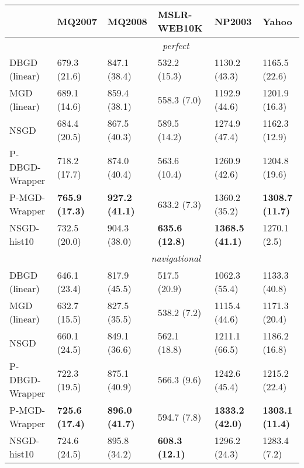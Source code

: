 \begin{tabular*}{\textwidth}{@{\extracolsep{\fill} } l  l l l l l  }
\toprule
 & { \small \textbf{MQ2007}}  & { \small \textbf{MQ2008}}  & { \small \textbf{MSLR-WEB10K}}  & { \small \textbf{NP2003}}  & { \small \textbf{Yahoo}} \\
\midrule
& \multicolumn{5}{|c|}{\textit{perfect}} \\
\midrule
DBGD (linear) & 679.3 {\tiny (21.6)} & 847.1 {\tiny (38.4)} & 532.2 {\tiny (15.3)} & 1130.2 {\tiny (43.3)} & 1165.5 {\tiny (22.6)} \\
MGD (linear) & 689.1 {\tiny (14.6)} & 859.4 {\tiny (38.1)} & 558.3 {\tiny (7.0)} & 1192.9 {\tiny (44.6)} & 1201.9 {\tiny (16.3)} \\
NSGD & 684.4 {\tiny (20.5)} & 867.5 {\tiny (40.3)} & 589.5 {\tiny (14.2)} & 1274.9 {\tiny (47.4)} & 1162.3 {\tiny (12.9)} \\
P-DBGD-Wrapper & 718.2 {\tiny (17.7)} & 874.0 {\tiny (40.4)} & 563.6 {\tiny (10.4)} & 1260.9 {\tiny (42.6)} & 1204.8 {\tiny (19.6)} \\
P-MGD-Wrapper & \bf 765.9 {\tiny (17.3)} & \bf 927.2 {\tiny (41.1)} & 633.2 {\tiny (7.3)} & 1360.2 {\tiny (35.2)} & \bf 1308.7 {\tiny (11.7)} \\
NSGD-hist10 & 732.5 {\tiny (20.0)} & 904.3 {\tiny (38.0)} & \bf 635.6 {\tiny (12.8)} & \bf 1368.5 {\tiny (41.1)} & 1270.1 {\tiny (2.5)} \\
\midrule
& \multicolumn{5}{|c|}{\textit{navigational}} \\
\midrule
DBGD (linear) & 646.1 {\tiny (23.4)} & 817.9 {\tiny (45.5)} & 517.5 {\tiny (20.9)} & 1062.3 {\tiny (55.4)} & 1133.3 {\tiny (40.8)} \\
MGD (linear) & 632.7 {\tiny (15.5)} & 827.5 {\tiny (35.5)} & 538.2 {\tiny (7.2)} & 1115.4 {\tiny (44.6)} & 1171.3 {\tiny (20.4)} \\
NSGD & 660.1 {\tiny (24.5)} & 849.1 {\tiny (36.6)} & 562.1 {\tiny (18.8)} & 1211.1 {\tiny (66.5)} & 1186.2 {\tiny (16.8)} \\
P-DBGD-Wrapper & 722.3 {\tiny (19.5)} & 875.1 {\tiny (40.9)} & 566.3 {\tiny (9.6)} & 1242.6 {\tiny (45.4)} & 1215.2 {\tiny (22.4)} \\
P-MGD-Wrapper & \bf 725.6 {\tiny (17.4)} & \bf 896.0 {\tiny (41.7)} & 594.7 {\tiny (7.8)} & \bf 1333.2 {\tiny (42.0)} & \bf 1303.1 {\tiny (11.4)} \\
NSGD-hist10 & 724.6 {\tiny (24.5)} & 895.8 {\tiny (34.2)} & \bf 608.3 {\tiny (12.1)} & 1296.2 {\tiny (24.3)} & 1283.4 {\tiny (7.2)} \\

\end{tabular*}
